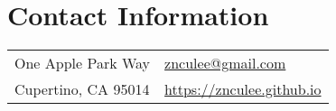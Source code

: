 
\section{\sc Contact Information}

\newcommand{\CVEmail}{znculee@gmail.com}
\newcommand{\CVWebpage}{https://znculee.github.io}

\vspace{.05in}

\begin{tabular}{@{}p{2.75in}p{2in}}
One Apple Park Way  & \href{mailto:\CVEmail}{\CVEmail} \\
Cupertino, CA 95014 & \href{\CVWebpage}{\url{\CVWebpage}} \\
\end{tabular}
